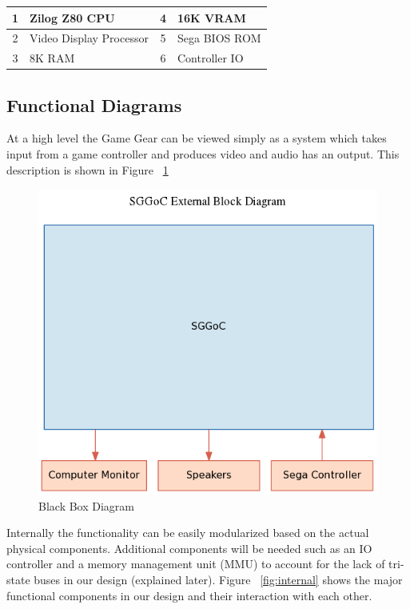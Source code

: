 \documentclass{article}
\begin{document}
\begin{table}[!htbp]
    \centering
    \begin{tabular}{|c|l|c|l|}
        \hline
        1 & Zilog Z80 CPU           & 4 & 16K VRAM      \\ \hline
        2 & Video Display Processor & 5 & Sega BIOS ROM \\ \hline
        3 & 8K RAM                  & 6 & Controller IO \\
        \hline
    \end{tabular}
\end{table}

\newpage
\subsection{Functional Diagrams}

At a high level the Game Gear can be viewed simply as a system which
takes input from a game controller and produces video and audio has an
output. This description is shown in Figure ~\ref{fig:external}

\begin{figure}[H]
\centering
\includegraphics[scale=0.4]{../block_diagrams/block_diagram_external.png}
\caption{Black Box Diagram}
\label{fig:external}
\end{figure}

Internally the functionality can be easily modularized based on the
actual physical components. Additional components will be needed such
as an IO controller and a memory management unit (MMU) to account for 
the lack of tri-state buses in our design (explained later). Figure
~\ref{fig:internal} shows the major functional components in our
design and their interaction with each other.
\end{document}
